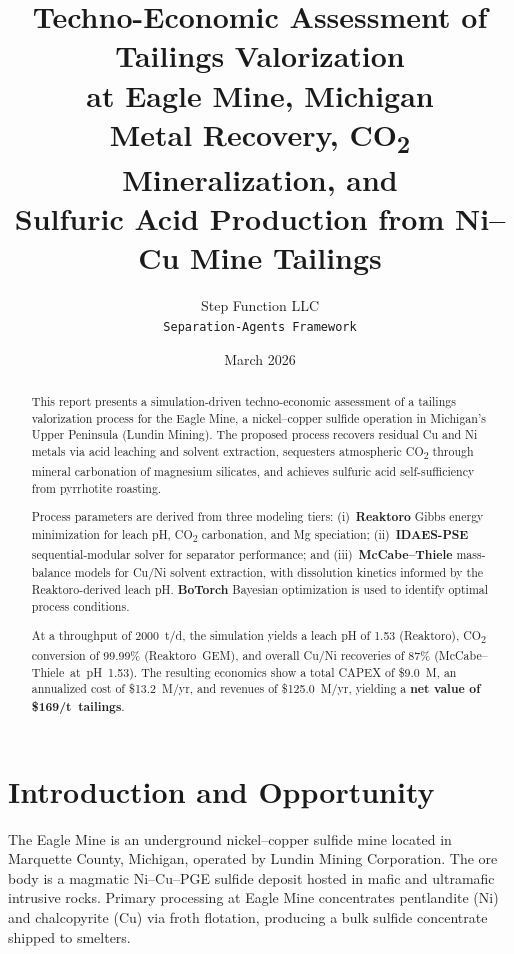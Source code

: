 \documentclass[11pt,a4paper]{article}
\title{%
  \textbf{Techno-Economic Assessment of Tailings Valorization\\
  at Eagle Mine, Michigan}\\[6pt]
  \large Metal Recovery, CO\textsubscript{2} Mineralization, and\\
  Sulfuric Acid Production from Ni--Cu Mine Tailings
}
\author{
  Step Function LLC\\
  \texttt{Separation-Agents Framework}
}
\date{March 2026}
\begin{document}
\maketitle

\begin{abstract}
This report presents a simulation-driven techno-economic assessment of a
tailings valorization process for the Eagle Mine, a nickel--copper
sulfide operation in Michigan's Upper Peninsula (Lundin Mining).  The
proposed process recovers residual Cu and Ni metals via acid leaching and
solvent extraction, sequesters atmospheric CO\textsubscript{2} through
mineral carbonation of magnesium silicates, and achieves sulfuric acid
self-sufficiency from pyrrhotite roasting.

Process parameters are derived from three modeling tiers:
(i)~\textbf{Reaktoro} Gibbs energy minimization for leach pH,
CO\textsubscript{2} carbonation, and Mg speciation;
(ii)~\textbf{IDAES-PSE} sequential-modular solver for separator
performance; and
(iii)~\textbf{McCabe--Thiele} mass-balance models for Cu/Ni solvent
extraction, with dissolution kinetics informed by the Reaktoro-derived
leach pH.
\textbf{BoTorch} Bayesian optimization is used to identify optimal
process conditions.

At a throughput of \num{2000}~t/d, the simulation yields a leach pH of
1.53 (Reaktoro), CO\textsubscript{2} conversion of 99.99\%
(Reaktoro~GEM), and overall Cu/Ni recoveries of 87\%
(McCabe--Thiele~at~pH~1.53).  The resulting economics show a total CAPEX
of \$\num{9.0}~M, an annualized cost of \$\num{13.2}~M/yr, and revenues
of \$\num{125.0}~M/yr, yielding a \textbf{net value of
\$\num{169}/t~tailings}.
\end{abstract}

\tableofcontents
\newpage

\section{Introduction and Opportunity}
\label{sec:introduction}

The Eagle Mine is an underground nickel--copper sulfide mine located in
Marquette County, Michigan, operated by Lundin Mining Corporation.  The
ore body is a magmatic Ni--Cu--PGE sulfide deposit hosted in mafic and
ultramafic intrusive rocks.  Primary processing at Eagle Mine
concentrates pentlandite (Ni) and chalcopyrite (Cu) via froth flotation,
producing a bulk sulfide concentrate shipped to smelters.
\end{document}
